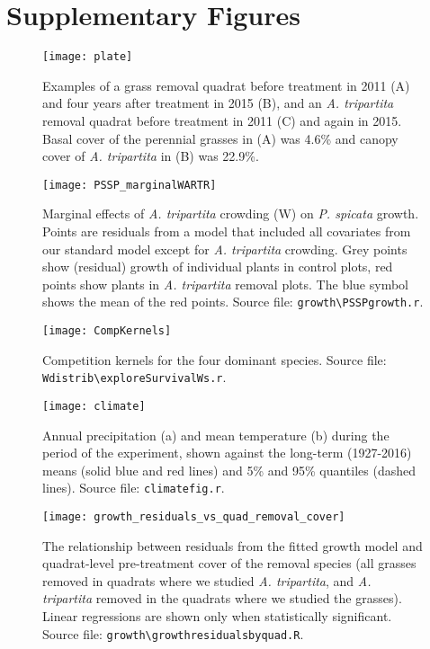 \documentclass[11pt]{article}
\begin{document}
\section{Supplementary Figures} 

 \begin{figure}[h]
 \centering
 \texttt{[image: plate]}
 \caption{Examples of a grass removal quadrat before treatment in 2011 (A) and four years after treatment in 2015 (B), and an \textit{A. tripartita} removal quadrat before treatment in 2011 (C) and again in 2015. Basal cover of the perennial grasses in (A) was 4.6\% and canopy cover of  \textit{A. tripartita} in (B) was 22.9\%. }
 \label{fig:photos}
 \end{figure}


 \begin{figure}[h]
 \centering
 \texttt{[image: PSSP\_marginalWARTR]}
 \caption{Marginal effects of \textit{A. tripartita} crowding (W) on \textit{P. spicata} growth. Points are residuals from a model that included all 
 covariates from our standard model except for \textit{A. tripartita} crowding. Grey points show (residual) growth of individual plants in control plots, red points show plants in \textit{A. tripartita} removal plots. The blue symbol shows the mean of the red points. Source file: \texttt{growth\textbackslash PSSPgrowth.r}. }
 \label{fig:PSSPresids}
 \end{figure}

 \begin{figure}[h]
 \centering
 \texttt{[image: CompKernels]}
 \caption{Competition kernels for the four dominant species. Source file: \texttt{Wdistrib\textbackslash exploreSurvivalWs.r}. }
 \label{fig:CompKernels}
 \end{figure}
 
  \begin{figure}[h]
  \centering
  \texttt{[image: climate]}
  \caption{Annual precipitation (a) and mean temperature (b) during the period of the experiment, shown against the long-term (1927-2016) means (solid blue and red lines) and 5\% and 95\% quantiles (dashed lines). Source file:  \texttt{climate\textunderscore fig.r}.}
  \label{fig:climate}
  \end{figure}
  
\begin{figure}[h]
\centering
\texttt{[image: growth\_residuals\_vs\_quad\_removal\_cover]}
\caption{The relationship between residuals from the fitted growth model and quadrat-level pre-treatment cover of the removal species (all grasses removed in quadrats where we studied \textit{A. tripartita}, and \textit{A. tripartita} removed in the quadrats where we studied the grasses). Linear regressions are shown only when statistically significant. Source file:  \texttt{growth\textbackslash growth\textunderscore residuals\textunderscore by\textunderscore quad.R}.}
\label{fig:GrowthResidsQuad}
\end{figure}
    
\end{document}

